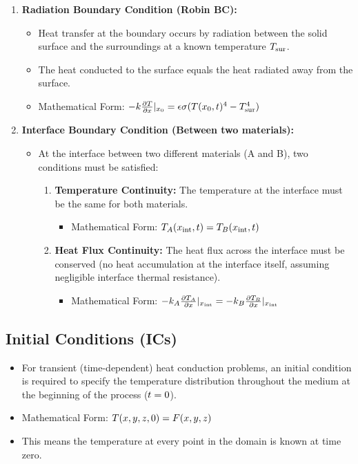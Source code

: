 \begin{enumerate}
    \item \textbf{Radiation Boundary Condition (Robin BC):}
        \begin{itemize}
            \item Heat transfer at the boundary occurs by radiation between the solid surface and the surroundings at a known temperature $T_{\text{sur}}$.
            \item The heat conducted to the surface equals the heat radiated away from the surface.
            \item Mathematical Form: $-k \frac{\partial T}{\partial x}|_{x_0} = \epsilon \sigma (T(x_0, t)^4 - T_{\text{sur}}^4)$
        \end{itemize}

    \item \textbf{Interface Boundary Condition (Between two materials):}
        \begin{itemize}
            \item At the interface between two different materials (A and B), two conditions must be satisfied:
                \begin{enumerate}
                    \item \textbf{Temperature Continuity:} The temperature at the interface must be the same for both materials.
                        \begin{itemize}
                            \item Mathematical Form: $T_A(x_{\text{int}}, t) = T_B(x_{\text{int}}, t)$
                        \end{itemize}
                    \item \textbf{Heat Flux Continuity:} The heat flux across the interface must be conserved (no heat accumulation at the interface itself, assuming negligible interface thermal resistance).
                        \begin{itemize}
                            \item Mathematical Form: $-k_A \frac{\partial T_A}{\partial x}|_{x_{\text{int}}} = -k_B \frac{\partial T_B}{\partial x}|_{x_{\text{int}}}$
                        \end{itemize}
                \end{enumerate}
        \end{itemize}
\end{enumerate}

\subsection{Initial Conditions (ICs)}
\begin{itemize}
    \item For transient (time-dependent) heat conduction problems, an initial condition is required to specify the temperature distribution throughout the medium at the beginning of the process ($t = 0$).
    \item Mathematical Form: $T(x, y, z, 0) = F(x, y, z)$
    \item This means the temperature at every point in the domain is known at time zero.
\end{itemize}

